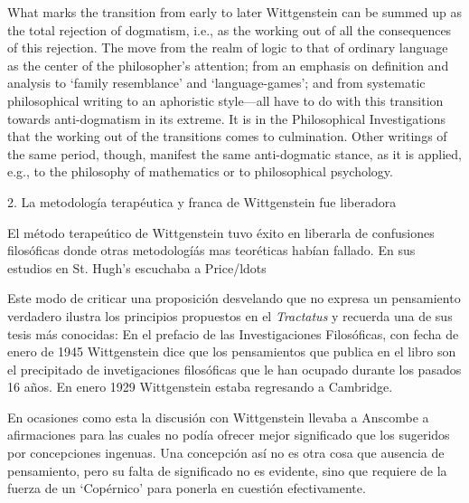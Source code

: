   \begin{revision}
    What marks the transition from early to later Wittgenstein can be summed up
    as the total rejection of dogmatism, i.e., as the working out of all the
    consequences of this rejection. The move from the realm of logic to that of
    ordinary language as the center of the philosopher's attention; from an
    emphasis on definition and analysis to ‘family resemblance’ and
    ‘language-games’; and from systematic philosophical writing to an aphoristic
    style—all have to do with this transition towards anti-dogmatism in its
    extreme. It is in the Philosophical Investigations that the working out of
    the transitions comes to culmination. Other writings of the same period,
    though, manifest the same anti-dogmatic stance, as it is applied, e.g., to
    the philosophy of mathematics or to philosophical psychology.
    \end{revision}

    2. La metodología terapéutica y franca de Wittgenstein fue liberadora
    \begin{revision}

    El método terapeútico de Wittgenstein tuvo éxito en liberarla de confusiones
    filosóficas donde otras metodologíás mas teoréticas habían fallado. En sus
    estudios en St. Hugh's escuchaba a Price/ldots
    \end{revision}

    \begin{revision}
      Este modo de criticar una proposición desvelando que no expresa un
      pensamiento verdadero ilustra los principios propuestos en el
      \emph{Tractatus} y recuerda una de sus tesis más conocidas: En el prefacio
      de las Investigaciones Filosóficas, con fecha de enero de 1945
      Wittgenstein dice que los pensamientos que publica en el libro son el
      precipitado de invetigaciones filosóficas que le han ocupado durante los
      pasados 16 años. En enero 1929 Wittgenstein estaba regresando a Cambridge.
      \end{revision}

      \begin{revision}
        En ocasiones como esta la discusión con Wittgenstein llevaba a Anscombe
        a afirmaciones para las cuales no podía ofrecer mejor significado que
        los sugeridos por concepciones ingenuas. Una concepción así no es otra
        cosa que ausencia de pensamiento, pero su falta de significado no es
        evidente, sino que requiere de la fuerza de un `Copérnico' para ponerla
        en cuestión efectivamente.\autocite[cf. 151]{IWT}
        \end{revision}

